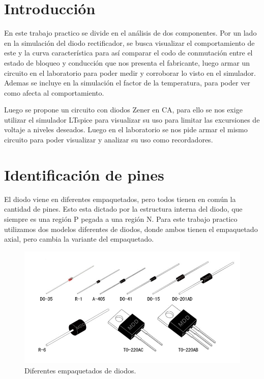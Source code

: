 \documentclass[chaptersright]{informeutn}
\begin{document}
  \maketitle

  \tableofcontents
  \setcounter{page}{1}
  \thispagestyle{plain}

  \chapter{Introducción}
    En este trabajo practico se divide en el análisis de dos componentes. Por un lado en la simulación del diodo
    rectificador, se busca visualizar el comportamiento de este y la curva característica para así comparar el codo de
    conmutación entre el estado de bloqueo y conducción que nos presenta el fabricante, luego armar un circuito en el
    laboratorio para poder medir y corroborar lo visto en el simulador. Ademas se incluye en la simulación el factor de
    la temperatura, para poder ver como afecta al comportamiento.

    Luego se propone un circuito con diodos Zener en CA, para ello se nos exige utilizar el simulador LTspice para
    visualizar su uso para limitar las excursiones de voltaje a niveles deseados. Luego en el laboratorio se nos pide
    armar el mismo circuito para poder visualizar y analizar su uso como recordadores.

  \chapter{Identificación de pines}
    El diodo viene en diferentes empaquetados, pero todos tienen en común la cantidad de pines. Esto esta dictado por
    la estructura interna del diodo, que siempre es una región P pegada a una región N. Para este trabajo practico
    utilizamos dos modelos diferentes de diodos, donde ambos tienen el empaquetado axial, pero cambia la variante del
    empaquetado.
    \begin{figure}[!ht]
      \centering
      \includegraphics[width=.9\textwidth]{images/empaquetados_diodos.jpg}
      \caption{Diferentes empaquetados de diodos.}
    \end{figure}
\end{document}
